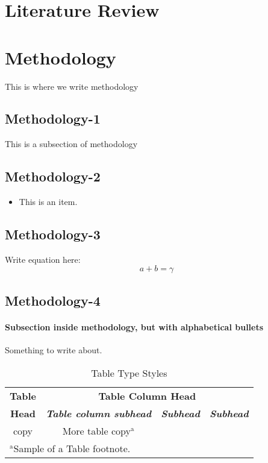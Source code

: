 \documentclass[conference]{IEEEtran}
\begin{document}
\section{Literature Review}


\section{Methodology}
This is where we write methodology

\subsection{Methodology-1}\label{AA}
This is a subsection of methodology 

\subsection{Methodology-2}
\begin{itemize}
\item This is an item.
\end{itemize}

\subsection{Methodology-3}
Write equation here:
\begin{equation}
a+b=\gamma\label{eq}
\end{equation}

\subsection{Methodology-4}
\paragraph{Subsection inside methodology, but with alphabetical bullets} Something to write about.
\begin{table}[htbp]
\caption{Table Type Styles}
\begin{center}
\begin{tabular}{|c|c|c|c|}
\hline
\textbf{Table}&\multicolumn{3}{|c|}{\textbf{Table Column Head}} \\
\cline{2-4} 
\textbf{Head} & \textbf{\textit{Table column subhead}}& \textbf{\textit{Subhead}}& \textbf{\textit{Subhead}} \\
\hline
copy& More table copy$^{\mathrm{a}}$& &  \\
\hline
\multicolumn{4}{l}{$^{\mathrm{a}}$Sample of a Table footnote.}
\end{tabular}
\label{tab1}
\end{center}
\end{table}
\end{document}
